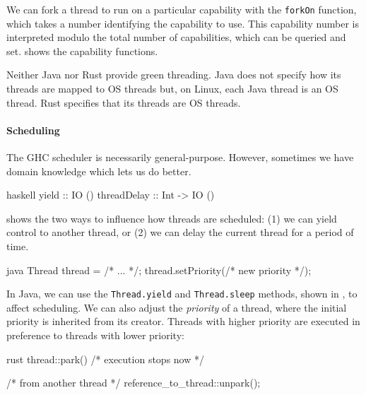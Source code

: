We can fork a thread to run on a particular capability with the
\verb|forkOn| function, which takes a number identifying the
capability to use.  This capability number is interpreted modulo the
total number of capabilities, which can be queried and set.
 shows the capability functions.

Neither Java nor Rust provide green threading.  Java does not specify
how its threads are mapped to OS threads but, on Linux, each Java
thread is an OS thread.  Rust specifies that its threads are OS
threads.

\paragraph{Scheduling}
The GHC scheduler is necessarily general-purpose.  However, sometimes
we have domain knowledge which lets us do better.

\begin{listing}
\centering
\begin{cminted}{haskell}
yield       :: IO ()
threadDelay :: Int -> IO ()
\end{cminted}
\caption{Controlling thread scheduling in Haskell.}\label{lst:schedule_haskell}
\end{listing}

 shows the two ways to influence how
threads are scheduled: (1) we can yield control to another thread, or
(2) we can delay the current thread for a period of time.

\begin{listing}
\centering
\begin{cminted}{java}
Thread thread = /* ... */;
thread.setPriority(/* new priority */);
\end{cminted}
\caption{Thread priority in Java.}\label{lst:schedule_java}
\end{listing}

In Java, we can use the \verb|Thread.yield| and \verb|Thread.sleep|
methods, shown in , to affect scheduling.  We
can also adjust the \emph{priority} of a thread, where the initial
priority is inherited from its creator.  Threads with higher priority
are executed in preference to threads with lower priority:

\begin{listing}[h!]
\centering
\begin{cminted}{rust}
thread::park() /* execution stops now */

/* from another thread */
reference_to_thread::unpark();
\end{cminted}
\caption{Thread parking and unparking in Rust.}\label{lst:schedule_rust}
\end{listing}

